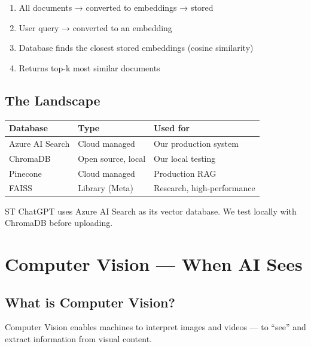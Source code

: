 \documentclass[11pt,a4paper]{report}
\begin{document}
\begin{enumerate}
    \item All documents → converted to embeddings → stored
    \item User query → converted to an embedding
    \item Database finds the closest stored embeddings (cosine similarity)
    \item Returns top-k most similar documents
\end{enumerate}

\section{The Landscape}

\begin{table}[h]
\centering
\begin{tabularx}{\textwidth}{l l X}
\toprule
\textbf{Database} & \textbf{Type} & \textbf{Used for} \\
\midrule
Azure AI Search & Cloud managed & Our production system \\
ChromaDB & Open source, local & Our local testing \\
Pinecone & Cloud managed & Production RAG \\
FAISS & Library (Meta) & Research, high-performance \\
\bottomrule
\end{tabularx}
\end{table}

\begin{projectbox}
ST ChatGPT uses Azure AI Search as its vector database. We test locally with ChromaDB before uploading.
\end{projectbox}

\chapter{Computer Vision --- When AI Sees}

\section{What is Computer Vision?}

Computer Vision enables machines to interpret images and videos --- to ``see'' and extract information from visual content.
\end{document}
